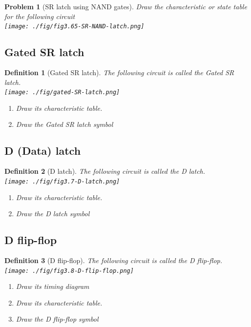 \documentclass{article}
\newtheorem{prob}{Problem}
\newtheorem{definition}{Definition}
\begin{document}
\begin{prob}[SR latch using NAND gates]
Draw the characteristic or state table for the following circuit\\
  \texttt{[image: ./fig/fig3.65-SR-NAND-latch.png]} \\
\end{prob}

\subsection{Gated SR latch \cite[Sec~5.2]{stephen2022fundamentals}}

\begin{definition}[Gated SR latch]
  The following circuit is called the Gated SR latch. \\
  \texttt{[image: ./fig/gated-SR-latch.png]} \\
  \begin{enumerate}
  \item Draw its characteristic table.
  \item Draw the Gated SR latch symbol
  \end{enumerate}
\end{definition}
\vspace{20em}

\subsection{D (Data) latch \cite[Sec~3.2.2]{harris2022digital}}

\begin{definition}[D latch]
  The following circuit is called the D latch. \\
  \texttt{[image: ./fig/fig3.7-D-latch.png]} \\
  \begin{enumerate}
  \item Draw its characteristic table.
  \item Draw the D latch symbol
  \end{enumerate}
\end{definition}
\vspace{20em}

\subsection{D flip-flop \cite[Sec~3.2.2]{harris2022digital}}

\begin{definition}[D flip-flop]
  The following circuit is called the D flip-flop. \\
  \texttt{[image: ./fig/fig3.8-D-flip-flop.png]} \\
  \begin{enumerate}
  \item Draw its timing  diagram
  \item Draw its characteristic table.
  \item Draw the D flip-flop symbol
  \end{enumerate}
\end{definition}
\vspace{20em}
\end{document}
